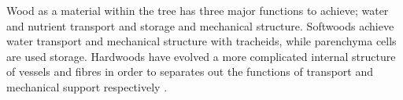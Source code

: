 Wood as a material within the tree has three major functions to achieve; water
and nutrient transport and storage and mechanical structure. Softwoods
achieve water transport and mechanical structure with tracheids, while
parenchyma cells are used storage. Hardwoods have evolved a more
complicated internal structure of vessels and fibres in order to separates out
the functions of transport and mechanical support respectively \cite{walker1993primary}.